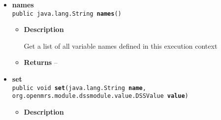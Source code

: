 {{{{\begin{itemize}
{\begin{itemize}
{Get the currently-specified return value. This will be Java null whenever no return value has been specified. This is important, as BlockInterpreter polls for changes to return value and stops executing if their are any (in order to ensure that a function call ends immediately upon return.)
}
\item{{\bf  Returns} -- 
 
}%
\item{{\bf  See also}
  \begin{itemize}
\item{ BlockInterpreter}
  \end{itemize}
}%
\end{itemize}
}%
\item{ 
\hypertarget{org.openmrs.module.dssmodule.state.ExecutionContext.names()}{{\bf  names}\\}
\texttt{public java.lang.String\lbrack \rbrack \ {\bf  names}()
\label{org.openmrs.module.dssmodule.state.ExecutionContext.names()}}%
\begin{itemize}
\item{
{\bf  Description}

Get a list of all variable names defined in this execution context
}
\item{{\bf  Returns} -- 
 
}%
\end{itemize}
}%
\item{ 
\hypertarget{org.openmrs.module.dssmodule.state.ExecutionContext.set(java.lang.String, org.openmrs.module.dssmodule.value.DSSValue)}{{\bf  set}\\}
\texttt{public void\ {\bf  set}(\texttt{java.lang.String} {\bf  name},
\texttt{org.openmrs.module.dssmodule.value.DSSValue} {\bf  value})
\label{org.openmrs.module.dssmodule.state.ExecutionContext.set(java.lang.String, org.openmrs.module.dssmodule.value.DSSValue)}}%
\begin{itemize}
\item{
{\bf  Description}

}
\end{itemize}}
\end{itemize}}}}}
